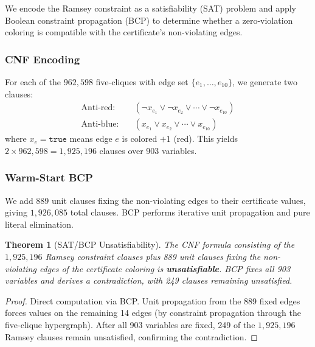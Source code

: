 \documentclass[11pt,a4paper]{article}
\theoremstyle{plain}
\newtheorem{theorem}{Theorem}[section]
\theoremstyle{remark}
\begin{document}
We encode the Ramsey constraint as a satisfiability (SAT) problem
and apply Boolean constraint propagation (BCP) to determine whether
a zero-violation coloring is compatible with the certificate's
non-violating edges.

\subsubsection{CNF Encoding}

For each of the $962{,}598$ five-cliques with edge set
$\{e_1, \ldots, e_{10}\}$, we generate two clauses:
\begin{align}
  \text{Anti-red:} &\quad (\neg x_{e_1} \lor \neg x_{e_2} \lor
    \cdots \lor \neg x_{e_{10}}) \label{eq:anti-red} \\
  \text{Anti-blue:} &\quad (x_{e_1} \lor x_{e_2} \lor
    \cdots \lor x_{e_{10}}) \label{eq:anti-blue}
\end{align}
where $x_e = \texttt{true}$ means edge $e$ is colored $+1$ (red).
This yields $2 \times 962{,}598 = 1{,}925{,}196$ clauses over 903
variables.

\subsubsection{Warm-Start BCP}

We add 889 unit clauses fixing the non-violating edges to their
certificate values, giving $1{,}926{,}085$ total clauses. BCP
performs iterative unit propagation and pure literal elimination.

\begin{theorem}[SAT/BCP Unsatisfiability]\label{thm:unsat}
The CNF formula consisting of the $1{,}925{,}196$ Ramsey constraint
clauses plus 889 unit clauses fixing the non-violating edges of the
certificate coloring is \textbf{unsatisfiable}. BCP fixes all 903
variables and derives a contradiction, with 249 clauses remaining
unsatisfied.
\end{theorem}

\begin{proof}
Direct computation via BCP. Unit propagation from the 889 fixed
edges forces values on the remaining 14 edges (by constraint
propagation through the five-clique hypergraph). After all 903
variables are fixed, 249 of the $1{,}925{,}196$ Ramsey clauses
remain unsatisfied, confirming the contradiction.
\end{proof}
\end{document}
